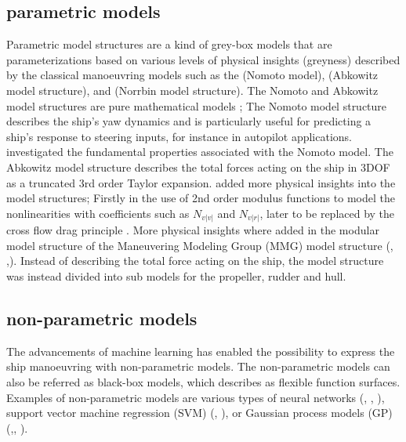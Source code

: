 \subsection{parametric models}
Parametric model structures are a kind of grey-box models that are parameterizations based on various levels of physical insights (greyness) described by the classical manoeuvring models such as the \cite{nomotoSteeringQualitiesShips1957} (Nomoto model), \cite{abkowitzShipHydrodynamicsSteering1964} (Abkowitz model structure), and \cite{norrbinTheoryObservationsUse1971} (Norrbin model structure). The Nomoto and Abkowitz model structures are pure mathematical models ; The Nomoto model structure describes the ship's yaw dynamics and is particularly useful for predicting a ship's response to steering inputs, for instance in autopilot applications. \cite{tzengFUNDAMENTALPROPERTIESLINEAR1999} investigated the fundamental properties associated with the Nomoto model. The Abkowitz model structure describes the total forces acting on the ship in 3DOF as a truncated 3rd order Taylor expansion. \cite{norrbinTheoryObservationsUse1971} added more physical insights into the model structures; Firstly in the use of 2nd order modulus functions  to model the nonlinearities with coefficients such as $N_{v|v|}$ and $N_{v|r|}$, later to be replaced by the cross flow drag principle \cite{fossenHandbookMarineCraft2011}. More physical insights where added in the modular model structure of the Maneuvering Modeling Group (MMG) model structure (\cite{ogawaMathematicalModelManoeuvring1978}, \cite{inouePracticalCalculationMethod1981},\cite{yasukawaIntroductionMMGStandard2015}). Instead of describing the total force acting on the ship, the model structure was instead divided into sub models for the propeller, rudder and hull.
\subsection{non-parametric models}
The advancements of machine learning has enabled the possibility to express the ship manoeuvring with non-parametric models. The non-parametric models can also be referred as black-box models, which \cite{ljungPerspectivesSystemIdentification2010} describes as flexible function surfaces.
Examples of non-parametric models are various types of neural networks (\cite{rajeshSystemIdentificationNonlinear2008}, \cite{heBlackBoxModelingShip2020}, \cite{heNonparametricModelingShip2022}), support vector machine regression (SVM) (\cite{chenOnlineModelingPrediction2023a}, \cite{zihaowangKernelbasedSupportVector2020}), or Gaussian process models (GP) (\cite{zhangLocallyWeightedNonParametric2021},\cite{xueIdentificationPredictionShip2021}, \cite{xueOnlineIdentificationShip2022}).  

